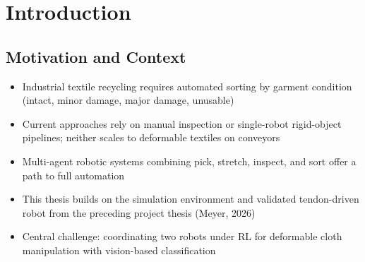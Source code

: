 
\chapter{Introduction}\label{ch:introduction}

\section{Motivation and Context}
\begin{itemize}
    \item Industrial textile recycling requires automated sorting by garment condition (intact, minor damage, major damage, unusable)
    \item Current approaches rely on manual inspection or single-robot rigid-object pipelines; neither scales to deformable textiles on conveyors
    \item Multi-agent robotic systems combining pick, stretch, inspect, and sort offer a path to full automation
    \item This thesis builds on the simulation environment and validated tendon-driven robot from the preceding project thesis (Meyer, 2026)
    \item Central challenge: coordinating two robots under RL for deformable cloth manipulation with vision-based classification
\end{itemize}

